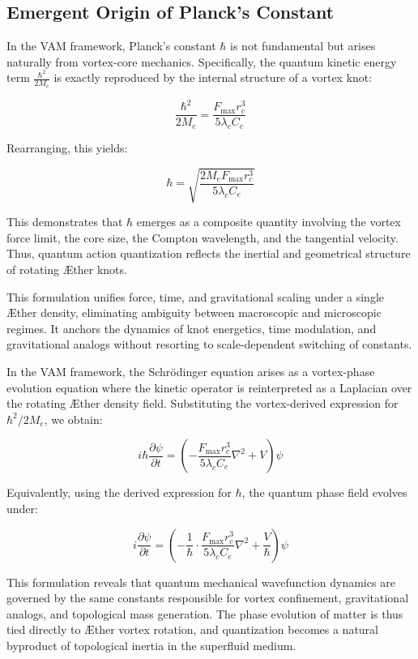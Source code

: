 \subsection*{Emergent Origin of Planck's Constant}

In the VAM framework, Planck's constant $\hbar$ is not fundamental but arises naturally from vortex-core mechanics. Specifically, the quantum kinetic energy term $\frac{\hbar^2}{2M_e}$ is exactly reproduced by the internal structure of a vortex knot:

\[
\frac{\hbar^2}{2M_e} = \frac{F_{\max} r_c^3}{5 \lambda_c C_e}
\]

Rearranging, this yields:

\[
\hbar = \sqrt{ \frac{2M_e F_{\max} r_c^3}{5 \lambda_c C_e} }
\]

This demonstrates that $\hbar$ emerges as a composite quantity involving the vortex force limit, the core size, the Compton wavelength, and the tangential velocity. Thus, quantum action quantization reflects the inertial and geometrical structure of rotating Æther knots.

This formulation unifies force, time, and gravitational scaling under a single Æther density, eliminating ambiguity between macroscopic and microscopic regimes. It anchors the dynamics of knot energetics, time modulation, and gravitational analogs without resorting to scale-dependent switching of constants.

In the VAM framework, the Schrödinger equation arises as a vortex-phase evolution equation where the kinetic operator is reinterpreted as a Laplacian over the rotating Æther density field. Substituting the vortex-derived expression for $\hbar^2 / 2 M_e$, we obtain:

\[
    i \hbar \frac{\partial \psi}{\partial t} = \left( -\frac{F_{\max} r_c^3}{5 \lambda_c C_e} \nabla^2 + V \right)\psi
\]

Equivalently, using the derived expression for $\hbar$, the quantum phase field evolves under:

\[
    i \frac{\partial \psi}{\partial t} = \left( - \frac{1}{\hbar} \cdot \frac{F_{\max} r_c^3}{5 \lambda_c C_e} \nabla^2 + \frac{V}{\hbar} \right)\psi
\]

This formulation reveals that quantum mechanical wavefunction dynamics are governed by the same constants responsible for vortex confinement, gravitational analogs, and topological mass generation. The phase evolution of matter is thus tied directly to Æther vortex rotation, and quantization becomes a natural byproduct of topological inertia in the superfluid medium.

